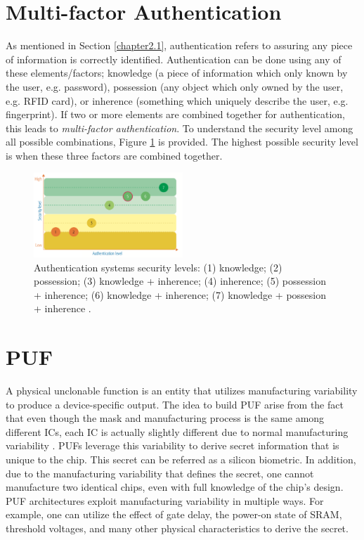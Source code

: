\section{Multi-factor Authentication}
\label{chp:2.mfa}
As mentioned in Section \ref{chapter2.1}, authentication refers to assuring any piece of information is correctly identified. Authentication can be done using any of these elements/factors; knowledge (a piece of information which only known by the user, e.g. password), possession (any object which only owned by the user, e.g. RFID card), or inherence (something which uniquely describe the user, e.g. fingerprint). If two or more elements are combined together for authentication, this leads to \textit{multi-factor authentication}. To understand the security level among all possible combinations, Figure \ref{fig:authentication} is provided. The highest possible security level is when these three factors are combined together.

\begin{figure}[tph!]
    \centerline{\includegraphics[width={0.5\textwidth}]{images/authentication}}
    \caption{Authentication systems security levels: (1) knowledge; (2) possession; (3) knowledge + inherence; (4) inherence; (5) possession + inherence; (6) knowledge + inherence; (7) knowledge + possesion + inherence \cite{Galdi2018ExploringNA}.}
    \label{fig:authentication}
\end{figure}


\section{PUF}
A physical unclonable function is an entity that utilizes manufacturing variability to produce a device-specific output. The idea to build PUF arise from the fact that even though the mask and manufacturing process is the same among different ICs, each IC is actually slightly different due to normal manufacturing variability \cite{retrospective}. PUFs leverage this variability to derive secret information that is unique to the chip. This secret can be referred as a silicon biometric.
In addition, due to the manufacturing variability that defines the secret, one cannot manufacture two identical chips, even with full knowledge of the chip’s design. PUF architectures exploit manufacturing variability in multiple ways. For example, one can utilize the effect of gate delay, the power-on state of SRAM, threshold voltages, and many other physical characteristics to derive the secret.

